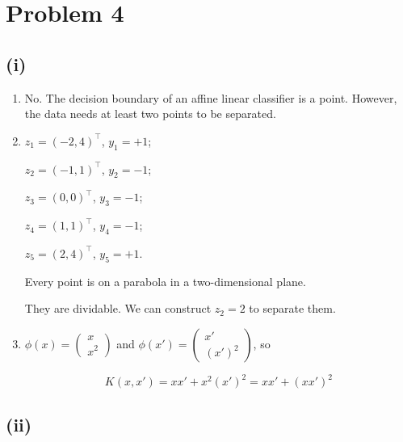 \documentclass[11pt]{article}
\begin{document}
\section*{Problem 4}

\subsection*{(i)}

\begin{enumerate}
    \item[1. ]
    
    No. The decision boundary of an affine linear classifier is a point. However, the data needs at least two points to be separated.

    \item[2. ]
    
    $z_1 = (-2, 4)^\top$, $y_1 = +1$;

    $z_2 = (-1, 1)^\top$, $y_2 = -1$;

    $z_3 = (0, 0)^\top$, $y_3 = -1$;

    $z_4 = (1, 1)^\top$, $y_4 = -1$;

    $z_5 = (2, 4)^\top$, $y_5 = +1$.

    Every point is on a parabola in a two-dimensional plane.

    They are dividable. We can construct $z_2 = 2$ to separate them.

    \item[3. ]
    
    $\phi(x) = \begin{pmatrix} x \\ x^2 \end{pmatrix}$ and $\phi(x') = \begin{pmatrix} x' \\ (x')^2 \end{pmatrix}$, so

    $$
    K(x, x') = x x' + x^2 (x')^2 = x x' + (x x')^2
    $$
\end{enumerate}

\subsection*{(ii)}
\end{document}
